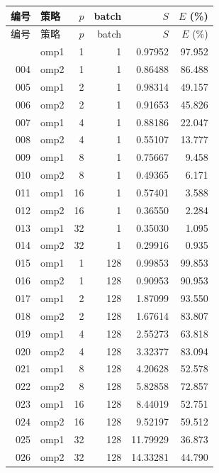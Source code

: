 \begingroup\fontsize{9.3}{11.8}\selectfont
\setlength{\tabcolsep}{4pt}
\begin{longtable}{rlrrrr}
\toprule
编号 & 策略 & $p$ & batch & $S$ & $E$ (\%)\\\midrule\endfirsthead
\toprule
编号 & 策略 & $p$ & batch & $S$ & $E$ (\%)\\\midrule\endhead
\bottomrule\endfoot
003 & omp1 & 1 & 1 & 0.97952 & 97.952\\
004 & omp2 & 1 & 1 & 0.86488 & 86.488\\
005 & omp1 & 2 & 1 & 0.98314 & 49.157\\
006 & omp2 & 2 & 1 & 0.91653 & 45.826\\
007 & omp1 & 4 & 1 & 0.88186 & 22.047\\
008 & omp2 & 4 & 1 & 0.55107 & 13.777\\
009 & omp1 & 8 & 1 & 0.75667 & 9.458\\
010 & omp2 & 8 & 1 & 0.49365 & 6.171\\
011 & omp1 & 16 & 1 & 0.57401 & 3.588\\
012 & omp2 & 16 & 1 & 0.36550 & 2.284\\
013 & omp1 & 32 & 1 & 0.35030 & 1.095\\
014 & omp2 & 32 & 1 & 0.29916 & 0.935\\
015 & omp1 & 1 & 128 & 0.99853 & 99.853\\
016 & omp2 & 1 & 128 & 0.90953 & 90.953\\
017 & omp1 & 2 & 128 & 1.87099 & 93.550\\
018 & omp2 & 2 & 128 & 1.67614 & 83.807\\
019 & omp1 & 4 & 128 & 2.55273 & 63.818\\
020 & omp2 & 4 & 128 & 3.32377 & 83.094\\
021 & omp1 & 8 & 128 & 4.20628 & 52.578\\
022 & omp2 & 8 & 128 & 5.82858 & 72.857\\
023 & omp1 & 16 & 128 & 8.44019 & 52.751\\
024 & omp2 & 16 & 128 & 9.52197 & 59.512\\
025 & omp1 & 32 & 128 & 11.79929 & 36.873\\
026 & omp2 & 32 & 128 & 14.33281 & 44.790\\
\end{longtable}
\endgroup
